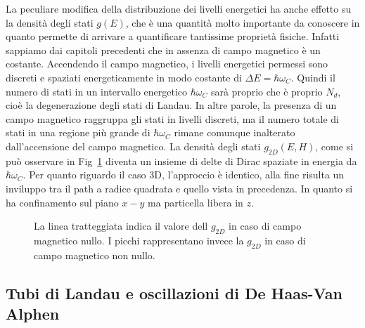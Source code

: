 La peculiare modifica della distribuzione dei livelli energetici ha anche effetto su la densit\`a degli stati $g(E)$, che \`e una quantit\`a molto importante da conoscere in quanto permette di arrivare a quantificare tantissime propriet\`a fisiche. Infatti sappiamo dai capitoli precedenti che 
in assenza di campo magnetico \`e un costante. Accendendo il campo magnetico, i livelli energetici permessi sono discreti e spaziati energeticamente in modo costante di $\Delta E = \hbar \omega_C$. Quindi il numero di stati in un intervallo energetico $\hbar\omega_C$ sar\`a proprio
che \`e proprio $N_d$, cio\`e la degenerazione degli stati di Landau. In altre parole, la presenza di un campo magnetico raggruppa gli stati in livelli discreti, ma il numero totale di stati in una regione pi\`u grande di $\hbar\omega_C$ rimane comunque inalterato dall'accensione del campo magnetico. La densit\`a degli stati $g_{2D}(E,H)$, come si pu\`o osservare in Fig~\ref{G2D:MAG} diventa un insieme di delte di Dirac spaziate in energia da $\hbar\omega_C$. Per quanto riguardo il caso 3D, l'approccio \`e identico, alla fine risulta un inviluppo tra il path a radice quadrata e quello vista in precedenza. In quanto si ha confinamento sul piano $x-y$ ma particella libera in $z$.
\begin{figure}
	\centering
	\caption{La linea tratteggiata indica il valore dell $g_{2D}$ in caso di campo magnetico nullo. I picchi rappresentano invece la $g_{2D}$ in caso di campo magnetico non nullo.}
	\label{G2D:MAG}
\end{figure}
\subsection{Tubi di Landau e oscillazioni di De Haas-Van Alphen}









